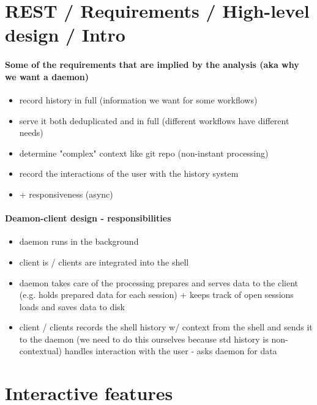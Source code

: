 \documentclass[thesis=M,english]{FITthesis}[2012/10/20]
\begin{document}
\section{REST / Requirements / High-level design / Intro}


\paragraph{Some of the requirements that are implied by the analysis (aka why we want a daemon)}
\begin{itemize}
    \item record history in full (information we want for some workflows)
    \item serve it both deduplicated and in full (different workflows have different needs)
    \item determine "complex" context like git repo (non-instant processing)
    \item record the interactions of the user with the history system
    \item + responsiveness (async)
\end{itemize}

\paragraph{Deamon-client design - responsibilities}

\begin{itemize}
    \item daemon runs in the background
    \item client is / clients are integrated into the shell %
    \item daemon 
    \subitem takes care of the processing
    \subitem prepares and serves data to the client (e.g. holds prepared data for each session)
    \subitem + keeps track of open sessions
    \subitem loads and saves data to disk
    \item client / clients
    \subitem records the shell history w/ context from the shell and sends it to the daemon (we need to do this ourselves because std history is non-contextual)
    \subitem handles interaction with the user - 
    \subitem asks daemon for data 
\end{itemize}


\section{Interactive features} %
\end{document}

